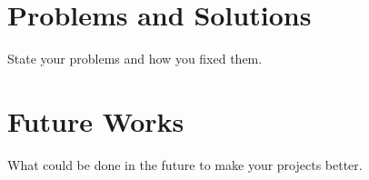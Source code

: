 \documentclass[12pt,oneside,openright,a4paper]{cpe-english-project}
\begin{document}
\section{Problems and Solutions}
State your problems and how you fixed them.

\section{Future Works}
What could be done in the future to make your projects better.


\nocite{*}


\end{document}
